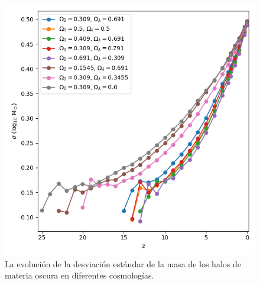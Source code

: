 \documentclass{beamer}
\begin{document}
\begin{frame}
\begin{columns}[t]
			\begin{column}{.5\textwidth}
				\begin{figure}
					\centering
					\includegraphics[scale=0.27]{Conc/MassStd_Conc.png}
					\caption{\footnotesize La evolución de la desviación estándar de la masa de los halos de materia oscura en diferentes cosmologías.}
					\label{fig:Conc-MassStd}
				\end{figure}
			\end{column}
		\end{columns}

	\end{frame}	
\end{document}

